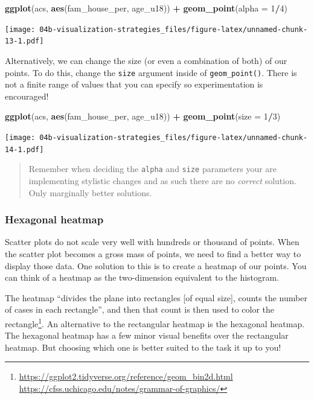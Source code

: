 \documentclass[
]{book}
\newenvironment{Shaded}{\begin{snugshade}}{\end{snugshade}}
\newcommand{\DataTypeTok}[1]{\textcolor[rgb]{0.13,0.29,0.53}{#1}}
\newcommand{\DecValTok}[1]{\textcolor[rgb]{0.00,0.00,0.81}{#1}}
\newcommand{\KeywordTok}[1]{\textcolor[rgb]{0.13,0.29,0.53}{\textbf{#1}}}
\newcommand{\NormalTok}[1]{#1}
\newcommand{\OperatorTok}[1]{\textcolor[rgb]{0.81,0.36,0.00}{\textbf{#1}}}
\newcommand{\StringTok}[1]{\textcolor[rgb]{0.31,0.60,0.02}{#1}}
\begin{document}
\begin{Shaded}
\begin{Highlighting}[]
\KeywordTok{ggplot}\NormalTok{(acs, }\KeywordTok{aes}\NormalTok{(fam\_house\_per, age\_u18)) }\OperatorTok{+}
\StringTok{  }\KeywordTok{geom\_point}\NormalTok{(}\DataTypeTok{alpha =} \DecValTok{1}\OperatorTok{/}\DecValTok{4}\NormalTok{)}
\end{Highlighting}
\end{Shaded}

\texttt{[image: 04b-visualization-strategies\_files/figure-latex/unnamed-chunk-13-1.pdf]}

Alternatively, we can change the size (or even a combination of both) of our points. To do this, change the \texttt{size} argument inside of \texttt{geom\_point()}. There is not a finite range of values that you can specify so experimentation is encouraged!

\begin{Shaded}
\begin{Highlighting}[]
\KeywordTok{ggplot}\NormalTok{(acs, }\KeywordTok{aes}\NormalTok{(fam\_house\_per, age\_u18)) }\OperatorTok{+}
\StringTok{  }\KeywordTok{geom\_point}\NormalTok{(}\DataTypeTok{size =} \DecValTok{1}\OperatorTok{/}\DecValTok{3}\NormalTok{)}
\end{Highlighting}
\end{Shaded}

\texttt{[image: 04b-visualization-strategies\_files/figure-latex/unnamed-chunk-14-1.pdf]}

\begin{quote}
Remember when deciding the \texttt{alpha} and \texttt{size} parameters your are implementing stylistic changes and as such there are no \emph{correct} solution. Only marginally better solutions.
\end{quote}

\hypertarget{hexagonal-heatmap}{%
\subsubsection{Hexagonal heatmap}\label{hexagonal-heatmap}}

Scatter plots do not scale very well with hundreds or thousand of points. When the scatter plot becomes a gross mass of points, we need to find a better way to display those data. One solution to this is to create a heatmap of our points. You can think of a heatmap as the two-dimension equivalent to the histogram.

The heatmap ``divides the plane into rectangles {[}of equal size{]}, counts the number of cases in each rectangle'', and then that count is then used to color the rectangle\footnote{\url{https://ggplot2.tidyverse.org/reference/geom_bin2d.html}
  \url{https://cfss.uchicago.edu/notes/grammar-of-graphics/}}. An alternative to the rectangular heatmap is the hexagonal heatmap. The hexagonal heatmap has a few minor visual benefits over the rectangular heatmap. But choosing which one is better suited to the task it up to you!
\end{document}
